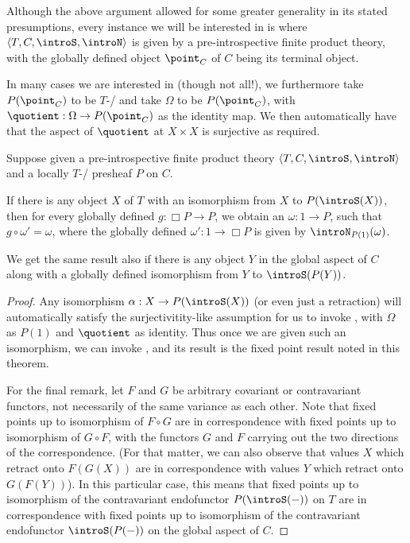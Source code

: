 \begin{corollary}\label{PreIntrospDiagSpecialization}
Although the above argument allowed for some greater generality in its stated presumptions, every instance we will be interested in is where $\langle T, C, \introS, \introN \rangle$ is given by a pre-introspective finite product theory, with the globally defined object $\point_C$ of $C$ being its terminal object.

In many cases we are interested in (though not all!), we furthermore take $P(\point_C)$ to be $T$-\repsmall/ and take $\Omega$ to be $P(\point_C)$, with $\quotient : \Omega \to P(\point_C)$ as the identity map. We then automatically have that the aspect of $\quotient$ at ${X \times X}$ is surjective as required.
\end{corollary}

\begin{theorem}\label{PreIntrospDiagFromIso}
Suppose given a pre-introspective finite product theory $\langle T, C, \introS, \introN \rangle$ and a locally $T$-\repsmall/ presheaf $P$  on $C$.

If there is any object $X$ of $T$ with an isomorphism from $X$ to $P(\introS(X))$, then for every globally defined $g : \Box P \to P$, we obtain an $\omega : 1 \to P$, such that $g \circ \omega' = \omega$, where the globally defined $\omega' : 1 \to \Box P$ is given by $\introN_{P(1)}(\omega)$. 

We get the same result also if there is any object $Y$ in the global aspect of $C$ along with a globally defined isomorphism from $Y$ to $\introS(P(Y))$.
\end{theorem}
\begin{proof}
Any isomorphism $\alpha : X \to P(\introS(X))$ (or even just a retraction) will automatically satisfy the surjectivitity-like assumption for us to invoke , with $\Omega$ as $P(1)$ and $\quotient$ as identity. Thus once we are given such an isomorphism, we can invoke , and its result is the fixed point result noted in this theorem.

For the final remark, let $F$ and $G$ be arbitrary covariant or contravariant functors, not necessarily of the same variance as each other. Note that fixed points up to isomorphism of $F \circ G$ are in correspondence with fixed points up to isomorphism of $G \circ F$, with the functors $G$ and $F$ carrying out the two directions of the correspondence. (For that matter, we can also observe that values $X$ which retract onto $F(G(X))$ are in correspondence with values $Y$ which retract onto $G(F(Y))$). In this particular case, this means that fixed points up to isomorphism of the contravariant endofunctor $P(\introS(-))$ on $T$ are in correspondence with fixed points up to isomorphism of the contravariant endofunctor $\introS(P(-))$ on the global aspect of $C$.
\end{proof}

